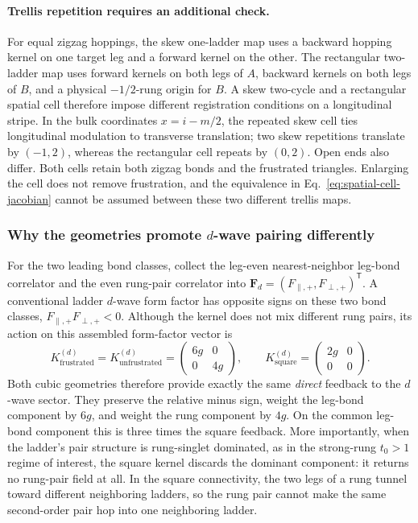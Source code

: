 \documentclass[11pt]{article}
\begin{document}
\paragraph{Trellis repetition requires an additional check.}
For equal zigzag hoppings, the skew one-ladder map uses a backward hopping
kernel on one target leg and a forward kernel on the other. The rectangular
two-ladder map uses forward kernels on both legs of \(A\), backward kernels
on both legs of \(B\), and a physical \(-1/2\)-rung origin for \(B\).
A skew two-cycle and a rectangular spatial cell therefore impose different
registration conditions on a longitudinal stripe. In the bulk coordinates
\(x=i-m/2\), the repeated skew cell ties longitudinal modulation to transverse
translation; two skew repetitions translate by \((-1,2)\), whereas the
rectangular cell repeats by \((0,2)\). Open ends also differ. Both cells retain
both zigzag bonds and the frustrated triangles. Enlarging the cell does not
remove frustration, and the equivalence in Eq.~\eqref{eq:spatial-cell-jacobian}
cannot be assumed between these two different trellis maps.

\subsubsection{Why the geometries promote \(d\)-wave pairing differently}

For the two leading bond classes, collect the leg-even nearest-neighbor
leg-bond correlator and the even rung-pair correlator into
\(\bm F_d=(F_{\parallel,+},F_{\perp,+})^{\mathsf T}\).  A
conventional ladder \(d\)-wave form factor has opposite signs on these two bond
classes, \(F_{\parallel,+}F_{\perp,+}<0\).  Although the kernel does not mix
different rung pairs, its action on this assembled form-factor vector is
\begin{equation}
 K^{(d)}_{\mathrm{frustrated}}
 =K^{(d)}_{\mathrm{unfrustrated}}
 =\begin{pmatrix}6g&0\\0&4g\end{pmatrix},
 \qquad
 K^{(d)}_{\mathrm{square}}
 =\begin{pmatrix}2g&0\\0&0\end{pmatrix}.
 \label{eq:d-wave-geometry-kernels}
\end{equation}
Both cubic geometries therefore provide exactly the same \emph{direct}
feedback to the \(d\)-wave sector.  They preserve the relative minus sign,
weight the leg-bond component by \(6g\), and weight the rung component by
\(4g\).  On the common leg-bond component this is three times the square
feedback.  More importantly, when the ladder's pair structure is rung-singlet
dominated, as in the strong-rung \(t_0>1\) regime of interest, the square kernel
discards the dominant component: it returns no rung-pair field at all.  In the
square connectivity, the two legs of a rung tunnel toward different neighboring
ladders, so the rung pair cannot make the same second-order pair hop into one
neighboring ladder.
\end{document}
